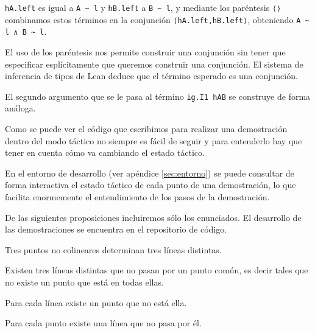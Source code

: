 \begin{enumerate}[label=L.\arabic*, topsep=0mm]
	      \lstinline{hA.left} es igual a \lstinline{A ~ l} y \lstinline{hB.left} a
	      \lstinline{B ~ l}, y mediante los paréntesis \lstinline{⟨⟩} combinamos
	      estos términos en la conjunción \lstinline{⟨hA.left,hB.left⟩}, obteniendo
	      \lstinline{A ~ l ∧ B ~ l}.

	      El uso de los paréntesis nos permite construir una conjunción sin
	      tener que especificar esplícitamente que queremos construir una
	      conjunción. El sistema de inferencia de tipos de Lean deduce que el
	      término esperado es una conjunción.

	      El segundo argumento que se le pasa al término \lstinline{ig.I1 hAB}
	      se construye de forma análoga.

\end{enumerate}

Como se puede ver el código que escribimos para realizar una demostración dentro
del modo táctico no siempre es fácil de seguir y para entenderlo hay que tener
en cuenta cómo va cambiando el estado táctico.

En el entorno de desarrollo (ver apéndice \ref{sec:entorno}) se puede consultar
de forma interactiva el estado táctico de cada punto de una demostración, lo que
facilita enormemente el entendimiento de los pasos de la demostración.

De las siguientes proposiciones incluiremos sólo los enunciados. El desarrollo
de las demostraciones se encuentra en el repositorio de código.

\begin{prop} Tres puntos no colineares determinan tres líneas distintas.
\end{prop}



\begin{prop}
	Existen tres líneas distintas que no pasan por un punto común, es decir
	tales que no existe un punto que está en todas ellas.
\end{prop}


\begin{prop}
	Para cada línea existe un punto que no está ella.
\end{prop}


\begin{prop}
	Para cada punto existe una línea que no pasa por él.
\end{prop}


























